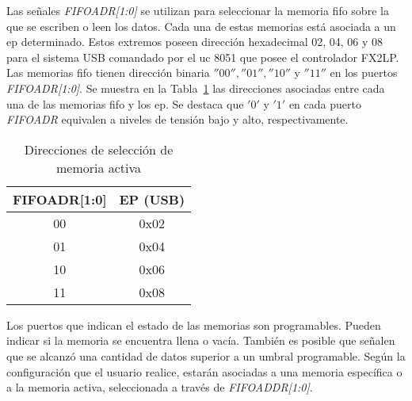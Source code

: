 	
	Las señales \textit{FIFOADR[1:0]} se utilizan para seleccionar la memoria \acrshort{fifo} sobre la que se escriben o leen los datos. Cada una de estas memorias está asociada a un \acrshort{ep} determinado. Estos extremos poseen dirección hexadecimal 02, 04, 06 y 08 para el sistema USB comandado por el \acrshort{uc} 8051 que posee el controlador FX2LP. Las memorias \acrshort{fifo} tienen dirección binaria $''00'', ''01'', ''10''$ y $''11''$ en los puertos \textit{FIFOADR[1:0]}. Se muestra en la Tabla~\ref{tab:fifoadr} las direcciones asociadas entre cada una de las memorias \acrshort{fifo} y los \acrshort{ep}. Se destaca que $'0'$ y $'1'$ en cada puerto \textit{FIFOADR} equivalen a niveles de tensión bajo y alto, respectivamente.
	
	\begin{table}[ht]
		\centering
		\begin{tabular}{cc}
			\hline
			FIFOADR[1:0] & EP (USB)\\
			\hline
			00 & 0x02\\
			01 & 0x04\\
			10 & 0x06\\
			11 & 0x08\\
			\hline
		\end{tabular}
		\caption{Direcciones de selección de memoria activa}
		\label{tab:fifoadr}
	\end{table}
	
	Los puertos que indican el estado de las memorias son programables. Pueden indicar si la memoria se encuentra llena o vacía. También es posible que señalen que se alcanzó una cantidad de datos superior a un umbral programable. Según la configuración que el usuario realice, estarán asociadas a una memoria específica o a la memoria activa, seleccionada a través de \textit{FIFOADDR[1:0]}.
	
	
